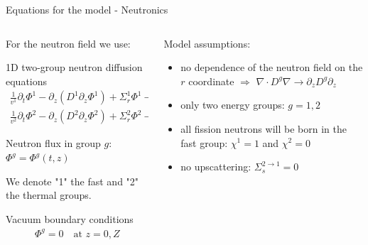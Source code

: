 

\begin{frame}{Equations for the model - Neutronics}

  \tiny

  \begin{columns}[T]
  \begin{column}{7cm}

    For the neutron field we use:

    \begin{block}{1D two-group neutron diffusion equations}
      \begin{align}
        \frac{1}{v^{1}} \partial_{t} \Phi^{1} 
        - \partial_{z} \left( D^{1} \partial_{z} \Phi^{1} \right) 
        + \Sigma_{r}^{1} \Phi^{1}
        - \frac{1}{\lambda} \nu \Sigma_{f}^{1} \Phi^{1}
        - \frac{1}{\lambda} \nu \Sigma_{f}^{2} \Phi^{2}
        & = 0 \nonumber \\
        \frac{1}{v^{2}} \partial_{t} \Phi^{2} 
        - \partial_{z} \left( D^{2} \partial_{z} \Phi^{2} \right) 
        + \Sigma_{r}^{2} \Phi^{2}
        - \Sigma_{s}^{1 \rightarrow 2} \Phi^{1}
        & = 0 \nonumber
      \end{align}
    \end{block}

    Neutron flux in group $ g $: $ \Phi^{g} = \Phi^{g}(t,z) $
    
    We denote "1" the fast and "2" the thermal groups.

    \begin{block}{Vacuum boundary conditions}
      \begin{align}
        \Phi^{g} = 0 
        \quad \mbox{at } z = 0, Z \nonumber
      \end{align}
    \end{block}

  \end{column}

  \begin{column}{5cm}

    Model assumptions:
    \begin{itemize}
    \item no dependence of the neutron field on the $ r $ coordinate $ \Rightarrow $ $ \nabla \cdot D^{g} \nabla \rightarrow \partial_{z} D^{g} \partial_{z} $
    \item only two energy groups: $ g = 1, 2 $
    \item all fission neutrons will be born in the fast group: $ \chi^{1} = 1 $ and $ \chi^{2} = 0 $
    \item no upscattering: $ \Sigma_{s}^{2\rightarrow 1} = 0 $
    \end{itemize}
 

\end{column}
\end{columns}
\end{frame}

